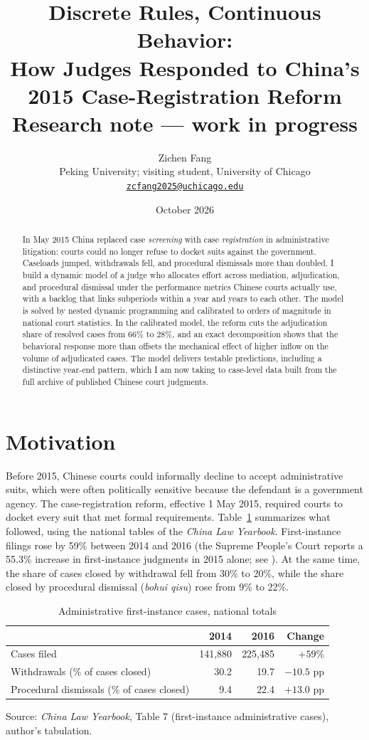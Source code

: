 \documentclass[11pt,letterpaper]{article}
\title{\textbf{Discrete Rules, Continuous Behavior:\\ How Judges Responded to China's 2015 Case-Registration Reform}\\[0.4em]
\large Research note --- work in progress}
\author{Zichen Fang\\ \small Peking University; visiting student, University of Chicago\\ \small \href{mailto:zcfang2025@uchicago.edu}{\texttt{zcfang2025@uchicago.edu}}}
\date{October 2026}
\begin{document}
\maketitle

\begin{abstract}
\noindent In May 2015 China replaced case \emph{screening} with case \emph{registration} in administrative litigation: courts could no longer refuse to docket suits against the government. Caseloads jumped, withdrawals fell, and procedural dismissals more than doubled. I build a dynamic model of a judge who allocates effort across mediation, adjudication, and procedural dismissal under the performance metrics Chinese courts actually use, with a backlog that links subperiods within a year and years to each other. The model is solved by nested dynamic programming and calibrated to orders of magnitude in national court statistics. In the calibrated model, the reform cuts the adjudication share of resolved cases from 66\% to 28\%, and an exact decomposition shows that the behavioral response more than offsets the mechanical effect of higher inflow on the volume of adjudicated cases. The model delivers testable predictions, including a distinctive year-end pattern, which I am now taking to case-level data built from the full archive of published Chinese court judgments.
\end{abstract}

\section{Motivation}

Before 2015, Chinese courts could informally decline to accept administrative suits, which were often politically sensitive because the defendant is a government agency. The case-registration reform, effective 1 May 2015, required courts to docket every suit that met formal requirements. Table~\ref{tab:facts} summarizes what followed, using the national tables of the \emph{China Law Yearbook}. First-instance filings rose by 59\% between 2014 and 2016 (the Supreme People's Court reports a 55.3\% increase in first-instance judgments in 2015 alone; see \citealp{ma2026}). At the same time, the share of cases closed by withdrawal fell from 30\% to 20\%, while the share closed by procedural dismissal (\emph{bohui qisu}) rose from 9\% to 22\%.

\begin{table}[h]
\centering\small
\caption{Administrative first-instance cases, national totals}\label{tab:facts}
\begin{tabular}{lrrr}
\toprule
 & 2014 & 2016 & Change \\
\midrule
Cases filed & 141,880 & 225,485 & $+59\%$ \\
Withdrawals (\% of cases closed) & 30.2 & 19.7 & $-10.5$ pp \\
Procedural dismissals (\% of cases closed) & 9.4 & 22.4 & $+13.0$ pp \\
\bottomrule
\end{tabular}
\par\smallskip\footnotesize Source: \emph{China Law Yearbook}, Table 7 (first-instance administrative cases), author's tabulation.
\end{table}
\end{document}
